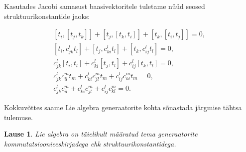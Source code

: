 \documentclass[12pt]{article}
\theoremstyle{plain}
\newtheorem{lause}{Lause}[section]
\theoremstyle{definition}
\numberwithin{equation}{section}
\begin{document}
Kasutades Jacobi samasust baasivektoritele tuletame nüüd seosed 
struktuurikonstantide jaoks:

\begin{align*}
\left[t_i, \left[t_j, t_k\right]\right] + 
	\left[t_j, \left[t_k, t_i\right]\right] + 
	\left[t_k, \left[t_i, t_j\right]\right] = 0, \\
\left[t_i, c_{jk}^{l}t_l\right] + 
	\left[t_j, c_{ki}^{l}t_l\right] + 
	\left[t_k, c_{ij}^{l}t_l\right] = 0, \\
c_{jk}^{l} \left[t_i, t_l\right] + 
	c_{ki}^{l} \left[t_j, t_l\right] + 
	c_{ij}^{l} \left[t_k, t_l\right] = 0, \\
c_{jk}^{l} c_{il}^{m} t_m + 
	c_{ki}^{l} c_{jl}^{m} t_m + 
	c_{ij}^{l} c_{kl}^{m} t_m = 0, \\
c_{jk}^{l} c_{il}^{m} + c_{ki}^{l} c_{jl}^{m} + 
	c_{ij}^{l} c_{kl}^{m} = 0.
\end{align*}

Kokkuvõttes saame Lie algebra generaatorite kohta sõnastada järgmise 
tähtsa tulemuse.
\begin{lause}
Lie algebra on täielikult määratud tema generaatorite 
kommutatsiooni\-eeskirjadega ehk struktuurikonstantidega.
\end{lause}
\end{document}
